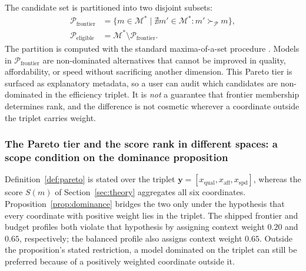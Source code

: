 \documentclass[pdflatex,sn-mathphys-num]{sn-jnl}
\theoremstyle{thmstyleone}
\theoremstyle{thmstylethree}
\begin{document}
The candidate set is partitioned into two disjoint subsets:
\begin{align}
\mathcal{P}_{\text{frontier}} &= \{ m \in \mathcal{M}^* \mid \nexists m' \in \mathcal{M}^* : m' \succ_{\mathcal{P}} m \}, \label{eq:p_front} \\
\mathcal{P}_{\text{eligible}} &= \mathcal{M}^* \setminus \mathcal{P}_{\text{frontier}}. \label{eq:p_elig}
\end{align}
The partition is computed with the standard maxima-of-a-set procedure \cite{kung1975maxima}. Models in $\mathcal{P}_{\text{frontier}}$ are non-dominated alternatives that cannot be improved in quality, affordability, or speed without sacrificing another dimension. This Pareto tier is surfaced as explanatory metadata, so a user can audit which candidates are non-dominated in the efficiency triplet. It is \emph{not} a guarantee that frontier membership determines rank, and the difference is not cosmetic wherever a coordinate outside the triplet carries weight.

\subsubsection{The Pareto tier and the score rank in different spaces: a scope condition on the dominance proposition}\label{subsec:pareto_scope}

Definition~\ref{def:pareto} is stated over the triplet $\mathbf{y} = [x_{\text{qual}}, x_{\text{aff}}, x_{\text{spd}}]$, whereas the score $S(m)$ of Section~\ref{sec:theory} aggregates all six coordinates. Proposition~\ref{prop:dominance} bridges the two only under the hypothesis that every coordinate with positive weight lies in the triplet. The shipped frontier and budget profiles both violate that hypothesis by assigning context weight $0.20$ and $0.65$, respectively; the balanced profile also assigns context weight $0.65$. Outside the proposition's stated restriction, a model dominated on the triplet can still be preferred because of a positively weighted coordinate outside it.
\end{document}
